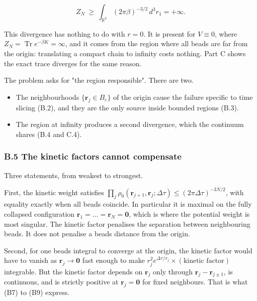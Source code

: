 \documentclass[11pt,a4paper]{article}
\newcommand{\tagmark}[1]{\marginnote{\scriptsize\ttfamily #1}}
\providecommand{\tightlist}{\setlength{\itemsep}{0pt}\setlength{\parskip}{0pt}}
\begin{document}
\begin{equation}
Z_N\ \ge\ \int_{\mathbb R^3}(2\pi\beta)^{-3/2}\,d^3r_1=+\infty .\tag{B13}
\end{equation}

This divergence has nothing to do with \(r=0\). It is present for \(V\equiv0\), where \(Z_N=\operatorname{Tr}e^{-\beta K}=\infty\), and it comes from the region where all beads are far from the origin: translating a compact chain to infinity costs nothing. Part C shows the exact trace diverges for the same reason.

The problem asks for "the region responsible". There are two.

\begin{itemize}
\tightlist
\item
  The neighbourhoods \(\{\mathbf r_j\in B_\varepsilon\}\) of the origin cause the failure specific to time slicing (B.2), and they are the only source inside bounded regions (B.3).
\item
  The region at infinity produces a second divergence, which the continuum shares (B.4 and C.4).
\end{itemize}

\hypertarget{b.5-the-kinetic-factors-cannot-compensate}{%
\subsubsection{B.5 The kinetic factors cannot compensate}\label{b.5-the-kinetic-factors-cannot-compensate}}

Three statements, from weakest to strongest.

\tagmark{[D]} First, the kinetic weight satisfies \(\prod_j\rho_0(\mathbf r_{j+1},\mathbf r_j;\Delta\tau)\le(2\pi\Delta\tau)^{-3N/2}\), with equality exactly when all beads coincide. In particular it is maximal on the fully collapsed configuration \(\mathbf r_1=\dots=\mathbf r_N=\mathbf 0\), which is where the potential weight is most singular. The kinetic factor penalises the separation between neighbouring beads. It does not penalise a bead\textquotesingle s distance from the origin.

\tagmark{[D]} Second, for one bead\textquotesingle s integral to converge at the origin, the kinetic factor would have to vanish as \(\mathbf r_j\to\mathbf 0\) fast enough to make \(r_j^2e^{\Delta\tau/r_j}\times(\text{kinetic factor})\) integrable. But the kinetic factor depends on \(\mathbf r_j\) only through \(\mathbf r_j-\mathbf r_{j\pm1}\), is continuous, and is strictly positive at \(\mathbf r_j=\mathbf 0\) for fixed neighbours. That is what (B7) to (B9) express.
\end{document}
